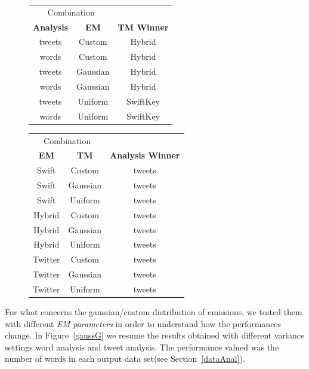 \documentclass[12pt]{article}
\begin{document}
\begin{figure}
\begin{minipage}{.45\textwidth}
  \setlength{\tabcolsep}{0.5em}
        \begin{tabular}{cc|c}
    \toprule
    \multicolumn{2}{c|}{Combination} &  \\
    \textbf{Analysis} & \textbf{EM}    & \textbf{TM Winner} \\
    \midrule
    tweets & Custom & Hybrid \\
    words & Custom & Hybrid \\
    tweets & Gaussian & Hybrid \\
    words & Gaussian & Hybrid \\
    tweets & Uniform & SwiftKey \\
    words & Uniform & SwiftKey \\
    \bottomrule
        \end{tabular}%
  \label{tab:tab2}%
\end{minipage}%
\begin{minipage}{.45\textwidth}
  \centering
    \begin{tabular}{cc|c}
    \toprule
    \multicolumn{2}{c|}{Combination} &  \\
    \textbf{EM} & \textbf{TM} & \textbf{Analysis Winner} \\
    \midrule
    Swift & Custom & tweets \\
    Swift & Gaussian & tweets \\
    Swift & Uniform & tweets \\
    Hybrid & Custom & tweets \\
    Hybrid & Gaussian & tweets \\
    Hybrid & Uniform & tweets \\
    Twitter & Custom & tweets \\
    Twitter & Gaussian & tweets \\
    Twitter & Uniform & tweets \\
    \bottomrule
    \end{tabular}%
  \label{tab:tab3}%
\end{minipage}%
\end{figure}%


For what concerns the gaussian/custom distribution of emissions, we tested them
with different \emph{EM parameters} in order to understand
how the performances change.
In Figure~\ref{gaussG} we resume the results obtained with
different variance settings  word analysis and tweet analysis. The
performance valued was the number of words in each output data set(see
Section~\ref{dataAnal}).
\end{document}
